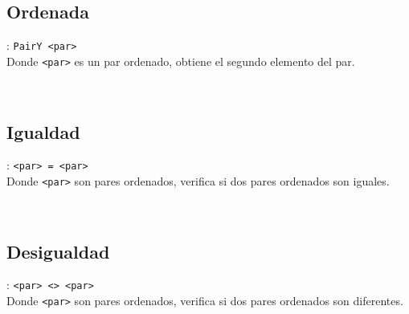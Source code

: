       \subsection*{Ordenada}: \texttt{PairY <par>}\\
      Donde \texttt{<par>} es un par ordenado, obtiene el segundo elemento del par.
      
      \begin{fxcode}
         \\
      \end{fxcode}
      
      \subsection*{Igualdad}: \texttt{<par>~=~<par>}\\
      Donde \texttt{<par>} son pares ordenados, verifica si dos pares ordenados son iguales.
      
      \begin{fxcode}
         \\
      \end{fxcode}
      
      \subsection*{Desigualdad}: \texttt{<par>~<>~<par>}\\
      Donde \texttt{<par>} son pares ordenados, verifica si dos pares ordenados son diferentes.
      
      \begin{fxcode}
         \\
      \end{fxcode}
      
   
   
   